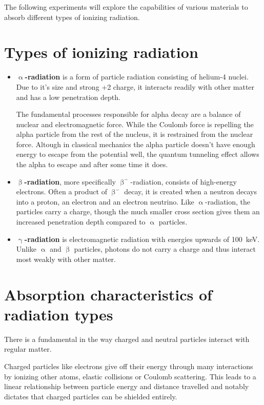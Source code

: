 
The following experiments will explore the capabilities of various materials to absorb different types of ionizing radiation.

\section{Types of ionizing radiation}
\begin{itemize}
	\item \textbf{$\upalpha$-radiation} is a form of particle radiation consisting of helium-4 nuclei.
	Due to it's size and strong +2 charge, it interacts readily with other matter and has a low penetration depth.

	The fundamental processes responsible for alpha decay are a balance of nuclear and electromagnetic force.
	While the Coulomb force is repelling the alpha particle from the rest of the nucleus, it is restrained from the nuclear force.
	Altough in classical mechanics the alpha particle doesn't have enough energy to escape from the potential well, the quantum tunneling effect allows the alpha to escape and after some time it does.
	\item \textbf{$\upbeta$-radiation}, more specifically $\upbeta^{-}$-radiation, consists of high-energy electrons.
	Often a product of $\upbeta^{-}$ decay, it is created when a neutron decays into a proton, an electron and an electron neutrino.
	Like $\upalpha$-radiation, the particles carry a charge, though the much smaller cross section gives them an increased penetration depth compared to $\upalpha$ particles.
	\item \textbf{$\upgamma$-radiation} is electromagnetic radiation with energies upwards of \SI{100}{\kilo\electronvolt}.
	Unlike $\upalpha$ and $\upbeta$ particles, photons do not carry a charge and thus interact most weakly with other matter.
\end{itemize}

\section{Absorption characteristics of radiation types}
There is a fundamental in the way charged and neutral particles interact with regular matter.

Charged particles like electrons give off their energy through many interactions by ionizing other atoms, elastic collisions or Coulomb scattering.
This leads to a linear relationship between particle energy and distance travelled and notably dictates that charged particles can be shielded entirely.

